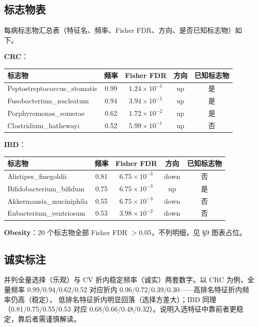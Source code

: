 \documentclass{internal-report}
\begin{document}
\subsection{标志物表}
每病标志物汇总表（特征名、频率、Fisher FDR、方向、是否已知标志物）如下。

\textbf{CRC}：
\begin{center}
\footnotesize
\begin{tabular}{l c c c c}
\toprule
标志物 & 频率 & Fisher FDR & 方向 & 已知标志物 \\
\midrule
Peptostreptococcus\_stomatis & 0.99 & $1.24\times10^{-5}$ & up & 是 \\
Fusobacterium\_nucleatum & 0.94 & $3.94\times10^{-5}$ & up & 是 \\
Porphyromonas\_somerae & 0.62 & $1.72\times10^{-2}$ & up & 是 \\
Clostridium\_hathewayi & 0.52 & $5.99\times10^{-1}$ & up & 否 \\
\bottomrule
\end{tabular}
\end{center}

\textbf{IBD}：
\begin{center}
\footnotesize
\begin{tabular}{l c c c c}
\toprule
标志物 & 频率 & Fisher FDR & 方向 & 已知标志物 \\
\midrule
Alistipes\_finegoldii & 0.81 & $6.75\times10^{-3}$ & down & 否 \\
Bifidobacterium\_bifidum & 0.75 & $6.75\times10^{-3}$ & up & 是 \\
Akkermansia\_muciniphila & 0.55 & $6.75\times10^{-3}$ & down & 否 \\
Eubacterium\_ventriosum & 0.53 & $3.98\times10^{-2}$ & down & 否 \\
\bottomrule
\end{tabular}
\end{center}

\textbf{Obesity}：20 个标志物全部 Fisher FDR $>0.05$，不列明细，见 §9 图表占位。

\subsection{诚实标注}
并列全量选择（乐观）与 CV 折内稳定频率（诚实）两套数字。以 CRC 为例，全量频率
0.99/0.94/0.62/0.52 对应折内 0.96/0.72/0.39/0.30——高排名特征折内频率仍高（稳定），
低排名特征折内明显回落（选择方差大）；IBD 同理（0.81/0.75/0.55/0.53 对应
0.68/0.66/0.48/0.32）。说明入选特征中靠前者更稳定，靠后者需谨慎解读。
\end{document}
